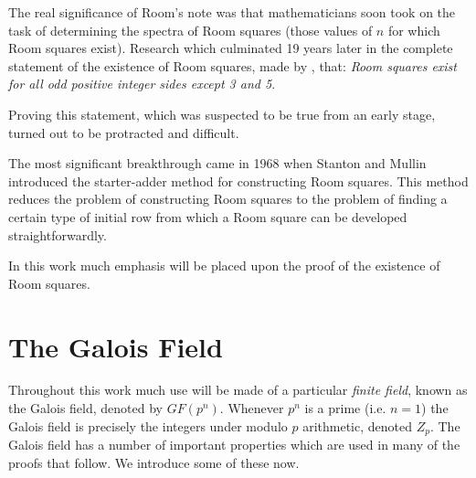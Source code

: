 The real significance of Room’s note was that mathematicians soon took on the task of determining the spectra of Room squares (those values of $n$ for which Room squares exist).
Research which culminated 19 years later in the complete statement of the existence of Room squares, made by \cite{wallisSolutionRoomSquare1974},
that: 
\emph{Room squares exist for all odd positive integer sides except 3 and 5}.

Proving this statement, which was suspected to be true from an early stage, turned out to be protracted and difficult.

The most significant breakthrough came in 1968 when Stanton and Mullin introduced the starter-adder method for constructing Room squares.
This method reduces the problem of constructing Room squares to the problem of finding a certain type of initial row from which a Room square can be developed straightforwardly.

In this work much emphasis will be placed upon the proof of the existence of Room squares.

\section{The Galois Field}

Throughout this work much use will be made of a particular
\emph{finite field},
known as the Galois field, denoted by $GF(p^n)$.
Whenever $p^n$ is a prime (i.e. $n = 1$) the Galois field is precisely the integers under modulo $p$ arithmetic, denoted $Z_p$.
The Galois field has a number of important properties which are used in many of the proofs that follow.
We introduce some of these now.

